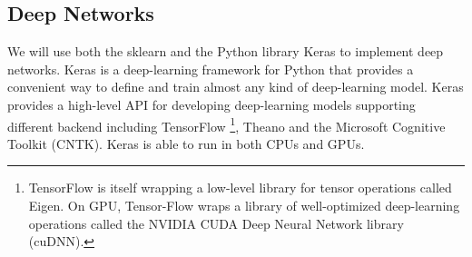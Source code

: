 \documentclass[11pt]{article}
\theoremstyle{definition}
\theoremstyle{remark}
\begin{document}
%




\subsection{Deep Networks}
\label{sse:resdeep}

We will use both the sklearn and the Python library Keras to implement deep networks. Keras is a deep-learning framework for Python that provides a convenient way to define and train almost any kind of deep-learning model. 
Keras provides a high-level API for developing deep-learning models supporting different backend including TensorFlow \footnote{TensorFlow is itself wrapping a low-level library for tensor operations called Eigen. On GPU, Tensor-Flow wraps a library of well-optimized deep-learning operations called the NVIDIA CUDA Deep Neural Network library (cuDNN).}, Theano and the Microsoft Cognitive Toolkit (CNTK). Keras is able to run in both CPUs and GPUs. 
\end{document}
